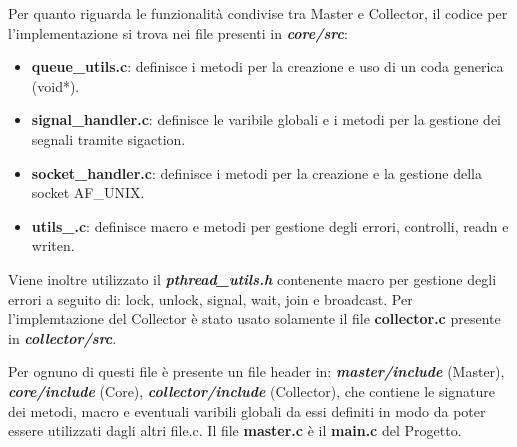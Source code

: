 \documentclass{article}
\begin{document}
Per quanto riguarda le  funzionalità condivise tra Master e Collector, il codice per l'implementazione si trova nei file presenti in \textbf{\textit{core/src}}:

\begin{itemize}
    \itemsep 0em
    \item \textbf{queue\_utils.c}: definisce i metodi per la creazione e uso di un coda generica (void*).
    \item \textbf{signal\_handler.c}: definisce le varibile globali e i metodi per la gestione dei segnali tramite sigaction.
    \item \textbf{socket\_handler.c}: definisce i metodi per la creazione e la gestione della socket AF\_UNIX.
    \item \textbf{utils\_.c}: definisce macro e metodi per gestione degli errori, controlli, readn e writen.
\end{itemize}

Viene inoltre utilizzato il \textit{\textbf{pthread\_utils.h}} contenente macro per gestione degli errori a seguito di: lock, unlock, signal, wait, join e broadcast.\newline\newline
Per l'implemtazione del Collector è stato usato solamente il file \textbf{collector.c} presente in \textbf{\textit{collector/src}}.\newline

Per ognuno di questi file è presente un file header in: \textbf{\textit{master/include}} (Master), \textbf{\textit{core/include}} (Core), \textbf{\textit{collector/include}} (Collector), che contiene le signature dei metodi, macro e eventuali varibili globali da essi definiti in modo da poter essere utilizzati dagli altri file.c.
\newline\newline
Il file \textbf{master.c} è il \textbf{main.c} del Progetto.
\end{document}

